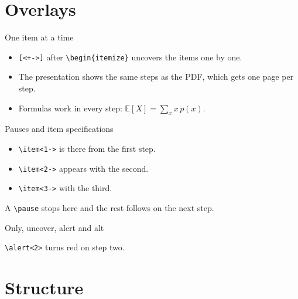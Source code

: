 \documentclass[aspectratio=169]{beamer}
\newcommand{\E}{\mathbb{E}}
\begin{document}
\section{Overlays}

\begin{frame}{One item at a time}
\begin{itemize}[<+->]
\item \texttt{[<+->]} after \texttt{\textbackslash{}begin\{itemize\}} uncovers the items one by one.
\item The presentation shows the same steps as the PDF, which gets one page per step.
\item Formulas work in every step: $\E[X]=\sum_{x}x\,p(x)$.
\end{itemize}
\end{frame}

\begin{frame}{Pauses and item specifications}
\begin{itemize}
\item<1-> \texttt{\textbackslash{}item<1->} is there from the first step.
\item<2-> \texttt{\textbackslash{}item<2->} appears with the second.
\item<3-> \texttt{\textbackslash{}item<3->} with the third.
\end{itemize}
A \texttt{\textbackslash{}pause} stops here \pause and the rest follows on the next step.
\end{frame}

\begin{frame}{Only, uncover, alert and alt}


\alert<2>{\texttt{\textbackslash{}alert<2>} turns red on step two.}

\end{frame}

\section{Structure}
\end{document}

